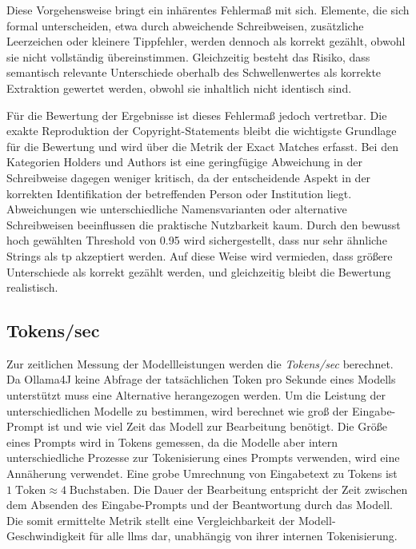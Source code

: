 Diese Vorgehensweise bringt ein inhärentes Fehlermaß mit sich.
Elemente, die sich formal unterscheiden, etwa durch abweichende Schreibweisen, zusätzliche Leerzeichen oder kleinere Tippfehler, werden dennoch als korrekt gezählt, obwohl sie nicht vollständig übereinstimmen.
Gleichzeitig besteht das Risiko, dass semantisch relevante Unterschiede oberhalb des Schwellenwertes als korrekte Extraktion gewertet werden, obwohl sie inhaltlich nicht identisch sind.

Für die Bewertung der Ergebnisse ist dieses Fehlermaß jedoch vertretbar.
Die exakte Reproduktion der Copyright-Statements bleibt die wichtigste Grundlage für die Bewertung und wird über die Metrik der Exact Matches erfasst.
Bei den Kategorien Holders und Authors ist eine geringfügige Abweichung in der Schreibweise dagegen weniger kritisch, da der entscheidende Aspekt in der korrekten Identifikation der betreffenden Person oder Institution liegt.
Abweichungen wie unterschiedliche Namensvarianten oder alternative Schreibweisen beeinflussen die praktische Nutzbarkeit kaum.
Durch den bewusst hoch gewählten Threshold von \num{0,95} wird sichergestellt, dass nur sehr ähnliche Strings als \gls{tp} akzeptiert werden.
Auf diese Weise wird vermieden, dass größere Unterschiede als korrekt gezählt werden, und gleichzeitig bleibt die Bewertung realistisch.


\subsection{Tokens/sec}
Zur zeitlichen Messung der Modellleistungen werden die \textit{Tokens/sec} berechnet.
Da Ollama4J keine Abfrage der tatsächlichen Token pro Sekunde eines Modells unterstützt muss eine Alternative herangezogen werden.
Um die Leistung der unterschiedlichen Modelle zu bestimmen, wird berechnet wie groß der Eingabe-Prompt ist und wie viel Zeit das Modell zur Bearbeitung benötigt.
Die Größe eines Prompts wird in Tokens gemessen, da die Modelle aber intern unterschiedliche Prozesse zur Tokenisierung eines Prompts verwenden, wird eine Annäherung verwendet.
Eine grobe Umrechnung von Eingabetext zu Tokens ist $1\;\text{Token}\approx 4\;\text{Buchstaben}$\autocite{noauthor_what_nodate}.
Die Dauer der Bearbeitung entspricht der Zeit zwischen dem Absenden des Eingabe-Prompts und der Beantwortung durch das Modell.
Die somit ermittelte Metrik stellt eine Vergleichbarkeit der Modell-Geschwindigkeit für alle \glspl{llm} dar, unabhängig von ihrer internen Tokenisierung.

